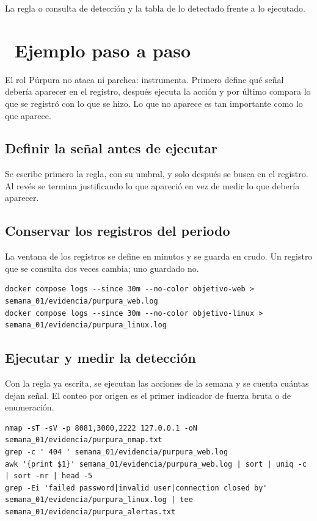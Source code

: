 \documentclass[11pt,a4paper]{article}
\newcommand{\iconotexto}[2]{\textcolor{cyanNeon}{\faIcon{#1}}~#2}
\begin{document}
La regla o consulta de detección y la tabla de lo detectado frente a lo ejecutado.

\section{\iconotexto{list-ol}{Ejemplo paso a paso}}

El rol Púrpura no ataca ni parchea: instrumenta. Primero define qué señal debería aparecer en el registro, después ejecuta la acción y por último compara lo que se registró con lo que se hizo. Lo que no aparece es tan importante como lo que aparece.

\subsection{Definir la señal antes de ejecutar}

Se escribe primero la regla, con su umbral, y solo después se busca en el registro. Al revés se termina justificando lo que apareció en vez de medir lo que debería aparecer.

\subsection{Conservar los registros del periodo}

La ventana de los registros se define en minutos y se guarda en crudo. Un registro que se consulta dos veces cambia; uno guardado no.

\begin{lstlisting}[style=estiloCodigo]
docker compose logs --since 30m --no-color objetivo-web > semana_01/evidencia/purpura_web.log
docker compose logs --since 30m --no-color objetivo-linux > semana_01/evidencia/purpura_linux.log
\end{lstlisting}

\subsection{Ejecutar y medir la detección}

Con la regla ya escrita, se ejecutan las acciones de la semana y se cuenta cuántas dejan señal. El conteo por origen es el primer indicador de fuerza bruta o de enumeración.

\begin{lstlisting}[style=estiloCodigo]
nmap -sT -sV -p 8081,3000,2222 127.0.0.1 -oN semana_01/evidencia/purpura_nmap.txt
grep -c ' 404 ' semana_01/evidencia/purpura_web.log
awk '{print $1}' semana_01/evidencia/purpura_web.log | sort | uniq -c | sort -nr | head -5
grep -Ei 'failed password|invalid user|connection closed by' semana_01/evidencia/purpura_linux.log | tee semana_01/evidencia/purpura_alertas.txt
\end{lstlisting}
\end{document}
